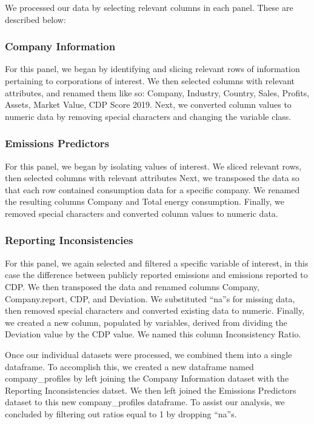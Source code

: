 \documentclass[
  12pt,
]{article}
\begin{document}
We processed our data by selecting relevant columns in each panel. These
are described below:

\hypertarget{company-information}{%
\subsubsection{Company Information}\label{company-information}}

For this panel, we began by identifying and slicing relevant rows of
information pertaining to corporations of interest. We then selected
columns with relevant attributes, and renamed them like so: Company,
Industry, Country, Sales, Profits, Assets, Market Value, CDP Score 2019.
Next, we converted column values to numeric data by removing special
characters and changing the variable class.

\hypertarget{emissions-predictors}{%
\subsubsection{Emissions Predictors}\label{emissions-predictors}}

For this panel, we began by isolating values of interest. We sliced
relevant rows, then selected columns with relevant attributes Next, we
transposed the data so that each row contained consumption data for a
specific company. We renamed the resulting columns Company and Total
energy consumption. Finally, we removed special characters and converted
column values to numeric data.

\hypertarget{reporting-inconsistencies}{%
\subsubsection{Reporting
Inconsistencies}\label{reporting-inconsistencies}}

For this panel, we again selected and filtered a specific variable of
interest, in this case the difference between publicly reported
emissions and emissions reported to CDP. We then transposed the data and
renamed columns Company, Company.report, CDP, and Deviation. We
substituted ``na''s for missing data, then removed special characters
and converted existing data to numeric. Finally, we created a new
column, populated by variables, derived from dividing the Deviation
value by the CDP value. We named this column Inconsistency Ratio.

Once our individual datasets were processed, we combined them into a
single dataframe. To accomplish this, we created a new dataframe named
company\_profiles by left joining the Company Information dataset with
the Reporting Inconsistencies datset. We then left joined the Emissions
Predictors dataset to this new company\_profiles dataframe. To assist
our analysis, we concluded by filtering out ratios equal to 1 by
dropping ``na''s.
\end{document}

